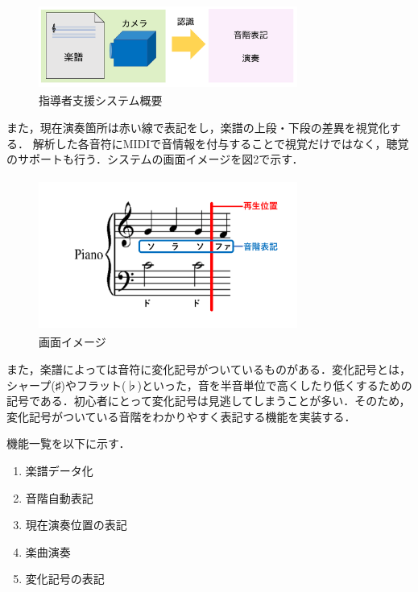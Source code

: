 \documentclass[twocolumn,10pt,a4j]{jsarticle}
\begin{document}
\begin{figure}[h]
\begin{center}
 \includegraphics[clip,width=85mm,height=28mm]{image.pdf}
\end{center}
 \caption{指導者支援システム概要}
 \label{fig:教科書}
\end{figure}

また，現在演奏箇所は赤い線で表記をし，楽譜の上段・下段の差異を視覚化する．
解析した各音符にMIDIで音情報を付与することで視覚だけではなく，聴覚のサポートも行う．システムの画面イメージを図2で示す．

\begin{figure}[h]
\begin{center}
 \includegraphics[clip,width=85mm,height=50mm]{image2.pdf}
\end{center}
 \caption{画面イメージ}
 \label{fig:教科書}
\end{figure}

また，楽譜によっては音符に変化記号がついているものがある．変化記号とは，シャープ(♯)やフラット(♭)といった，音を半音単位で高くしたり低くするための記号である．初心者にとって変化記号は見逃してしまうことが多い．そのため，変化記号がついている音階をわかりやすく表記する機能を実装する．

機能一覧を以下に示す．

\begin{enumerate}
\renewcommand {\labelenumi}{(\arabic{enumi})}
\item 楽譜データ化
\item 音階自動表記
\item 現在演奏位置の表記
\item 楽曲演奏
\item 変化記号の表記
\end{enumerate}
\end{document}

